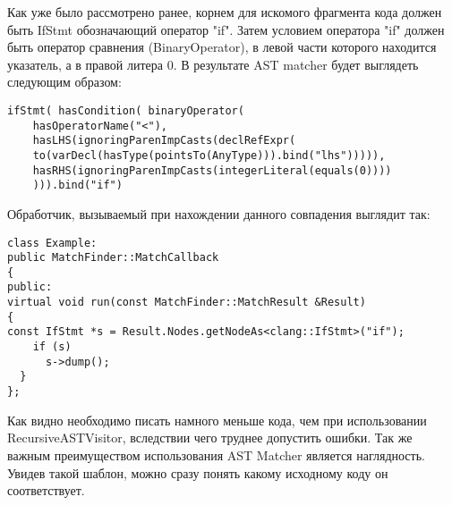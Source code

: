 Как уже было рассмотрено ранее, корнем для искомого фрагмента кода должен быть IfStmt обозначающий
оператор "if". Затем условием оператора "if" должен быть оператор сравнения (BinaryOperator), 
в левой части которого находится указатель, а в правой литера 0. В результате AST matcher будет
выглядеть следующим образом: 
\begin{lstlisting}
ifStmt( hasCondition( binaryOperator(
	hasOperatorName("<"),
	hasLHS(ignoringParenImpCasts(declRefExpr(
    to(varDecl(hasType(pointsTo(AnyType))).bind("lhs"))))),
    hasRHS(ignoringParenImpCasts(integerLiteral(equals(0))))
    ))).bind("if")
\end{lstlisting}

Обработчик, вызываемый при нахождении данного совпадения выглядит так:
\begin{lstlisting}
class Example:
public MatchFinder::MatchCallback 
{
public:
virtual void run(const MatchFinder::MatchResult &Result) 
{
const IfStmt *s = Result.Nodes.getNodeAs<clang::IfStmt>("if");
    if (s)
      s->dump();
  }
};
\end{lstlisting}

Как видно необходимо писать намного меньше кода, чем при использовании RecursiveASTVisitor,
вследствии чего труднее допустить ошибки. Так же важным преимуществом использования AST Matcher
является наглядность. Увидев такой шаблон, можно сразу понять какому исходному коду он соответствует. 
